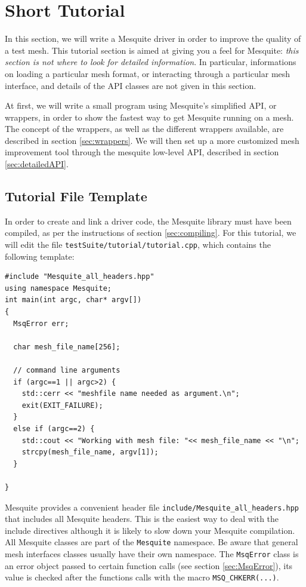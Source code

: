 \documentclass[letter]{report}
\begin{document}
\section{Short Tutorial}

In this section, we will write a Mesquite driver in order to improve the quality of a test
mesh. This tutorial section is aimed at giving you a feel for Mesquite: \emph{this section is not where to look
for detailed information}. In particular, informations on loading a particular mesh format, or
interacting through a particular mesh interface, and details of the API classes
are not given in this section.

At first, we will write a small program using Mesquite's simplified API, or wrappers, in order to show the
fastest way to get Mesquite running on a mesh. The concept of the wrappers, as well as the different
wrappers available, are described in section \ref{sec:wrappers}. We will then set up a more customized mesh
improvement tool through the mesquite low-level API, described in section \ref{sec:detailedAPI}.

\subsection{Tutorial File Template}
\label{sec:tutfile}

In order to create and link a driver code, the Mesquite library must have been compiled, as per the
instructions of section \ref{sec:compiling}. For this tutorial, we will edit the file
\texttt{testSuite/tutorial/tutorial.cpp}, which contains the following template:
\begin{verbatim}
#include "Mesquite_all_headers.hpp"
using namespace Mesquite;
int main(int argc, char* argv[])
{
  MsqError err;
  
  char mesh_file_name[256];
  
  // command line arguments
  if (argc==1 || argc>2) {
    std::cerr << "meshfile name needed as argument.\n";
    exit(EXIT_FAILURE);
  }
  else if (argc==2) {
    std::cout << "Working with mesh file: "<< mesh_file_name << "\n";
    strcpy(mesh_file_name, argv[1]);
  } 
  
}
\end{verbatim}
Mesquite provides a convenient header file \texttt{include/Mesquite\_all\_headers.hpp} that includes
all Mesquite headers. This is the easiest way to deal with the include directives although it is likely to slow
down your Mesquite compilation.
All Mesquite classes are part of the \texttt{Mesquite} namespace. Be aware that general mesh interfaces
classes usually have their own namespace. The \texttt{MsqError} class is an error object passed to 
certain function calls (see section \ref{sec:MsqError}), its value is checked after the functions calls with
the macro \texttt{MSQ\_CHKERR(...)}.
\end{document}
